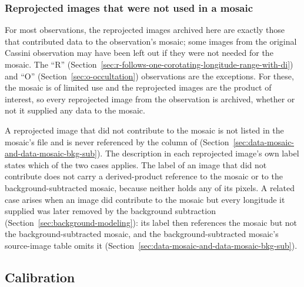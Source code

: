 \subsubsection{Reprojected images that were not used in a mosaic}
\label{sec:reprojected-images-not-used-in-a-mosaic}

For most observations, the reprojected images archived here are exactly those that contributed data to the observation’s mosaic; some images from the original Cassini observation may have been left out if they were not needed for the mosaic. The “R” (Section~\ref{sec:r-follows-one-corotating-longitude-range-with-di}) and “O” (Section~\ref{sec:o-occultation}) observations are the exceptions. For these, the mosaic is of limited use and the reprojected images are the product of interest, so every reprojected image from the observation is archived, whether or not it supplied any data to the mosaic.

A reprojected image that did not contribute to the mosaic is not listed in the mosaic’s  file and is never referenced by the  column of  (Section~\ref{sec:data-mosaic-and-data-mosaic-bkg-sub}). The description in each reprojected image’s own label states which of the two cases applies. The label of an image that did not contribute does not carry a derived-product reference to the mosaic or to the background-subtracted mosaic, because neither holds any of its pixels. A related case arises when an image did contribute to the mosaic but every longitude it supplied was later removed by the background subtraction (Section~\ref{sec:background-modeling}): its label then references the mosaic but not the background-subtracted mosaic, and the background-subtracted mosaic’s source-image table omits it (Section~\ref{sec:data-mosaic-and-data-mosaic-bkg-sub}).

\subsection{Calibration}
\label{sec:calibration}

